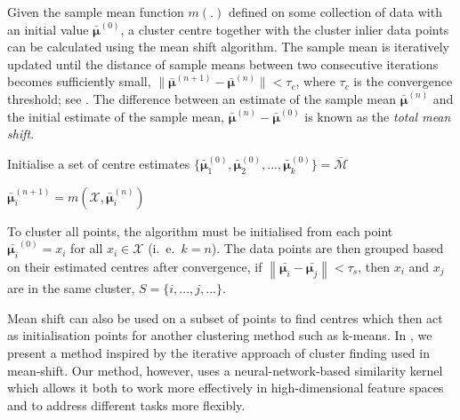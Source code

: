 \documentclass[../thesis.tex]{subfiles}
\begin{document}
Given the sample mean function $m(.)$ defined on some collection of data with an initial value $\bar{\boldsymbol{\mu}}^{(0)}$, a cluster centre together with the cluster inlier data points can be calculated using the mean shift algorithm. The sample mean is iteratively updated until the distance of sample means between two consecutive iterations becomes sufficiently small, \ie $\|\bar{\boldsymbol{\mu}}^{(n+1)} - \bar{\boldsymbol{\mu}}^{(n)} \| < \tau_c $, where $\tau_c$ is the convergence threshold; see . The difference between an estimate of the sample mean $\bar{\boldsymbol{\mu}}^{(n)}$ and the initial estimate of the sample mean, $\bar{\boldsymbol{\mu}}^{(n)}- \bar{\boldsymbol{\mu}}^{(0)}$  is known as the \textit{total mean shift}. 

\begin{algorithm}
\caption{Mean-Shift Algorithm}\label{alg__DMS__meanshift}
\begin{algorithmic}
\State Initialise a set of centre estimates $\{\boldsymbol{\bar{\mu}}^{(0)}_1, \boldsymbol{\bar{\mu}}^{(0)}_2, ..., \boldsymbol{\bar{\mu}}^{(0)}_k\} = \mathbf{\bar{\mathcal{M}}}$


        \State 
         $
            \bar {\boldsymbol{\mu}}^{(n+1)}_i = m(\mathcal{X}, \bar {\boldsymbol{\mu}}^{(n)}_i) 
        $
        
    \EndWhile
\EndFor
\EndFunction
\end{algorithmic}
\end{algorithm}

To cluster all points, the algorithm must be initialised from each point $\bar{\boldsymbol{\mu}_i}^{(0)} = x_i $ for all $x_i \in \mathcal{X}$ (i.\ e.\ $k=n$). The data points are then grouped based on their estimated centres after convergence, \ie if $\left\|\bar{\boldsymbol{\mu}_i} - \bar{\boldsymbol{\mu}_j}\right\| < \tau_s$,
then $x_i$ and $x_j$ are in the same cluster, $S = \{i, ... , j, ...\}$.

Mean shift can also be used on a subset of points to find centres which then act as initialisation points for another clustering method such as k-means.
In , we present a method inspired by the iterative approach of cluster finding used in mean-shift. 
Our method, however, uses a neural-network-based similarity kernel which allows it both to work more effectively in high-dimensional feature spaces and to address different tasks more flexibly.
\end{document}
